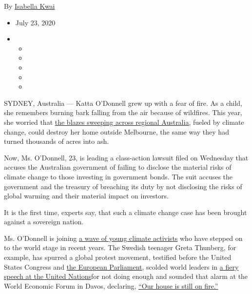 By \href{https://www.nytimes.com/by/isabella-kwai}{Isabella Kwai}

\begin{itemize}
\item
  July 23, 2020
\item
  \begin{itemize}
  \item
  \item
  \item
  \item
  \item
  \end{itemize}
\end{itemize}

SYDNEY, Australia --- Katta O'Donnell grew up with a fear of fire. As a
child, she remembers burning bark falling from the air because of
wildfires. This year, she worried that
\href{https://www.nytimes.com/2020/02/15/world/australia/fires-climate-change.html?searchResultPosition=2}{the
blazes sweeping across regional Australia,} fueled by climate change,
could destroy her home outside Melbourne, the same way they had turned
thousands of acres into ash.

Now, Ms. O'Donnell, 23, is leading a class-action lawsuit filed on
Wednesday that accuses the Australian government of failing to disclose
the material risks of climate change to those investing in government
bonds. The suit accuses the government and the treasury of breaching its
duty by not disclosing the risks of global warming and their material
impact on investors.

It is the first time, experts say, that such a climate change case has
been brought against a sovereign nation.

Ms. O'Donnell is joining
\href{https://www.nytimes.com/interactive/2020/07/21/magazine/teenage-activist-climate-change.html}{a
wave of young climate activists} who have stepped on to the world stage
in recent years. The Swedish teenager Greta Thunberg, for example, has
spurred a global protest movement, testified before the United States
Congress and
\href{https://www.nytimes.com/2020/03/04/world/europe/eu-climate-law-greta-thunberg.html?searchResultPosition=4}{the
European Parliament}, scolded world leaders in
\href{https://www.nytimes.com/2020/04/22/climate/earth-day-climate-coronavirus.html?searchResultPosition=2}{a
fiery speech at the United Nations}for not doing enough and sounded that
alarm at the World Economic Forum in Davos, declaring,
\href{https://www.nytimes.com/2020/01/21/climate/greta-thunberg-davos.html?searchResultPosition=9}{``Our
house is still on fire.''}

